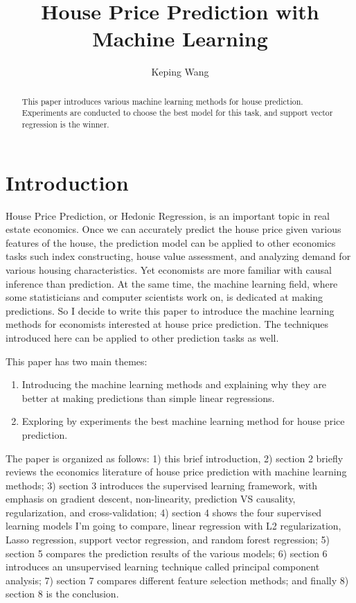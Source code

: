 \documentclass[a4paper]{article}
\title{House Price Prediction with Machine Learning}
\author{Keping Wang}
\begin{document}
\maketitle

\begin{abstract}
This paper introduces various machine learning methods for house prediction. Experiments are conducted to choose the best model for this task, and support vector regression is the winner.
\end{abstract}

\section{Introduction}
House Price Prediction, or Hedonic Regression, is an important topic in real estate economics. Once we can accurately predict the house price given various features of the house, the prediction model can be applied to other economics tasks such index constructing, house value assessment, and analyzing demand for various housing characteristics. Yet economists are more familiar with causal inference than prediction. At the same time, the machine learning field, where some statisticians and computer scientists work on, is dedicated at making predictions. So I decide to write this paper to introduce the machine learning methods for economists interested at house price prediction. The techniques introduced here can be applied to other prediction tasks as well. 

This paper has two main themes:
\begin{enumerate}
  \item Introducing the machine learning methods and explaining why they are better at making predictions than simple linear regressions.
  \item Exploring by experiments the best machine learning method for house price prediction.
\end{enumerate}

The paper is organized as follows: 1) this brief introduction, 2) section 2 briefly reviews the economics literature of house price prediction with machine learning methods; 3) section 3 introduces the supervised learning framework, with emphasis on gradient descent, non-linearity, prediction VS causality, regularization, and cross-validation; 4) section 4 shows the four supervised learning models I'm going to compare, linear regression with L2 regularization, Lasso regression, support vector regression, and random forest regression; 5) section 5 compares the prediction results of the various models; 6) section 6 introduces an unsupervised learning technique called principal component analysis; 7) section 7 compares different feature selection methods; and finally 8) section 8 is the conclusion.
\end{document}
